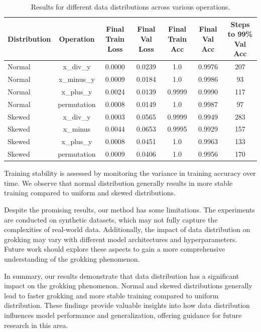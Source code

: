 \documentclass{article} %
\begin{document}
\begin{table}[h]
    \centering
    \begin{tabular}{lcccccc}
        \toprule
        Distribution & Operation & Final Train Loss & Final Val Loss & Final Train Acc & Final Val Acc & Steps to 99\% Val Acc \\
        \midrule
        Normal & x\_div\_y & 0.0000 & 0.0239 & 1.0 & 0.9976 & 207 \\
        Normal & x\_minus\_y & 0.0009 & 0.0184 & 1.0 & 0.9986 & 93 \\
        Normal & x\_plus\_y & 0.0024 & 0.0139 & 0.9999 & 0.9990 & 117 \\
        Normal & permutation & 0.0008 & 0.0149 & 1.0 & 0.9987 & 97 \\
        Skewed & x\_div\_y & 0.0003 & 0.0565 & 0.9999 & 0.9949 & 283 \\
        Skewed & x\_minus\y & 0.0044 & 0.0653 & 0.9995 & 0.9929 & 157 \\
        Skewed & x\_plus\_y & 0.0008 & 0.0451 & 1.0 & 0.9963 & 133 \\
        Skewed & permutation & 0.0009 & 0.0406 & 1.0 & 0.9956 & 170 \\
        \bottomrule
    \end{tabular}
    \caption{Results for different data distributions across various operations.}
    \label{tab:distribution_results}
\end{table}

Training stability is assessed by monitoring the variance in training accuracy over time. We observe that normal distribution generally results in more stable training compared to uniform and skewed distributions.

Despite the promising results, our method has some limitations. The experiments are conducted on synthetic datasets, which may not fully capture the complexities of real-world data. Additionally, the impact of data distribution on grokking may vary with different model architectures and hyperparameters. Future work should explore these aspects to gain a more comprehensive understanding of the grokking phenomenon.

In summary, our results demonstrate that data distribution has a significant impact on the grokking phenomenon. Normal and skewed distributions generally lead to faster grokking and more stable training compared to uniform distribution. These findings provide valuable insights into how data distribution influences model performance and generalization, offering guidance for future research in this area.
\end{document}
